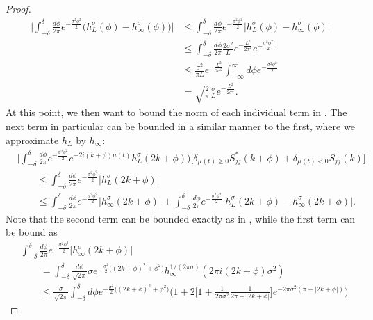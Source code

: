 \documentclass[../thesis-main/thesis-main]{subfiles}
\begin{document}
\begin{proof}
\begin{align}
  \Big| \int_{-\delta}^\delta \frac{d\phi}{2\pi} e^{-\frac{\sigma^2\phi^2}{2}} \big(h_{L}^\sigma(\phi) - h_{\infty}^\sigma(\phi)\big) \Big| &\leq \int_{-\delta}^\delta \frac{d\phi}{2\pi} e^{-\frac{\sigma^2\phi^2}{2}} \big| h_L^\sigma(\phi) - h_\infty^\sigma(\phi)\big|\\
   &\leq \int_{-\delta}^\delta \frac{d\phi}{2\pi}  \frac{2\sigma^2}{L} e^{- \frac {L^2}{2\sigma^2}}e^{-\frac{\sigma^2\phi^2}{2}}\\
   & \leq \frac{\sigma^2}{\pi L} e^{ - \frac{L^2}{2\sigma^2}} \int_{-\infty}^\infty d\phi e^{ - \frac{\sigma^2 \phi^2}{2}}\\
   &= \sqrt{\frac{2}{\pi}} \frac{\sigma}{L} e^{-\frac{L^2}{2\sigma^2}}\label{eq:gaussian_approx_L_to_infinity}.
\end{align}
At this point, we then want to bound the norm of each individual term in .  The next term in particular can be bounded in a similar manner to the first, where we approximate $h_L$ by $h_\infty$:
\begin{align}
  &\Bigg|\int_{-\delta}^{\delta} \frac{d\phi}{2\pi} e^{-\frac{\sigma^2\phi^2}{2}} e^{-2i (k+\phi) \mu(t)} h_{L}^\sigma(2k+\phi))\Big[\delta_{\mu(t) \geq 0} S_{jj}^*(k+\phi) + \delta_{\mu(t) < 0} S_{jj}(k) \Big] \Bigg|\\
  &\qquad \leq \int_{-\delta}^\delta \frac{d\phi}{2\pi} e^{-\frac{\sigma^2\phi^2}{2}} \big|h_L^\sigma(2k+\phi)\big|\\
  &\qquad \leq \int_{-\delta}^\delta \frac{d\phi}{2\pi} e^{-\frac{\sigma^2\phi^2}{2}} \big|h_\infty^\sigma(2k+\phi) \big| + \int_{-\delta}^\delta \frac{d\phi}{2\pi} e^{-\frac{\sigma^2\phi^2}{2}} \big| h_L^\sigma(2k+\phi)- h_\infty^\sigma(2k+\phi)\big|.
  \end{align}
Note that the second term can be bounded exactly as in , while the first term can be bound as  
\begin{align}
&\int_{-\delta}^\delta \frac{d\phi}{2\pi} e^{-\frac{\sigma^2\phi^2}{2}} \big|h_\infty^\sigma(2k+\phi) \big|\\
  &\qquad = \int_{-\delta}^\delta  \frac{d\phi}{\sqrt{2\pi}} \sigma e^{ -\frac{\sigma^2}{2} \big( (2k+ \phi)^2 + \phi^2\big)} h_{\infty}^{1/(2\pi\sigma)}(2\pi i (2k+\phi) \sigma^2) \\
  &\qquad \leq \frac{\sigma}{\sqrt{2\pi}} \int_{-\delta}^{\delta} d\phi e^{ -\frac{\sigma^2}{2} \big( (2k+ \phi)^2 + \phi^2\big)}\Big( 1 + 2 \Big[ 1 + \frac{1}{2\pi \sigma^2} \frac{1}{ 2\pi - |2k + \phi|}\Big] e^{- 2\pi \sigma^2 (\pi - |2k + \phi|)}\Big)\label{eq:gaussian_k_offset_midstep}

\end{align}
\end{proof}
\end{document}
